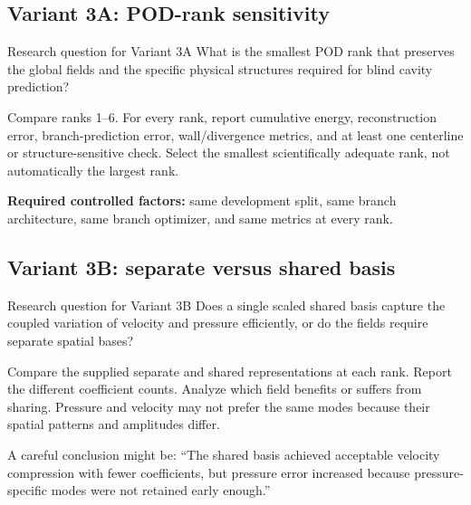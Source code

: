 \documentclass[11pt]{article}
\begin{document}
\subsection{Variant 3A: POD-rank sensitivity}
\begin{projectbox}{Research question for Variant 3A}
What is the smallest POD rank that preserves the global fields and the specific physical structures required for blind cavity prediction?
\end{projectbox}

Compare ranks 1--6. For every rank, report cumulative energy, reconstruction error, branch-prediction error, wall/divergence metrics, and at least one centerline or structure-sensitive check. Select the smallest scientifically adequate rank, not automatically the largest rank.

\textbf{Required controlled factors:} same development split, same branch architecture, same branch optimizer, and same metrics at every rank.

\subsection{Variant 3B: separate versus shared basis}
\begin{projectbox}{Research question for Variant 3B}
Does a single scaled shared basis capture the coupled variation of velocity and pressure efficiently, or do the fields require separate spatial bases?
\end{projectbox}

Compare the supplied separate and shared representations at each rank. Report the different coefficient counts. Analyze which field benefits or suffers from sharing. Pressure and velocity may not prefer the same modes because their spatial patterns and amplitudes differ.

A careful conclusion might be: ``The shared basis achieved acceptable velocity compression with fewer coefficients, but pressure error increased because pressure-specific modes were not retained early enough.''
\end{document}
